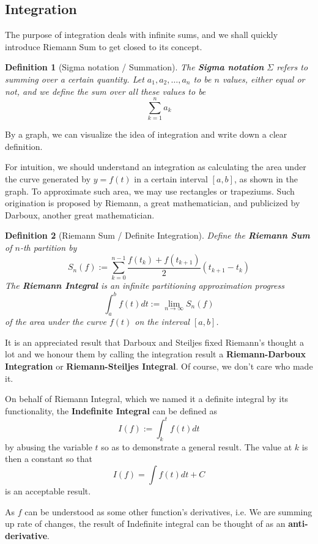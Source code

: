 \documentclass[12pt]{article}
\newtheorem{definition}{Definition}[section]
\begin{document}
    \subsection*{Integration}

    The purpose of integration deals with infinite sums, and we shall quickly introduce Riemann Sum to get closed to its concept.

    \begin{definition}[Sigma notation / Summation]
        The \textbf{Sigma notation} $\Sigma$ refers to summing over a certain quantity. Let $a_1,a_2,\dots,a_n$ to be $n$ values, either equal or not, and we define the sum over all these values to be \[\sum_{k=1}^{n}a_k\]
    \end{definition}

    By a graph, we can visualize the idea of integration and write down a clear definition.



    For intuition, we should understand an integration as calculating the area under the curve generated by $y=f(t)$ in a certain interval $[a,b]$, as shown in the graph. To approximate such area, we may use rectangles or trapeziums. Such origination is proposed by Riemann, a great mathematician, and publicized by Darboux, another great mathematician.

    \begin{definition}[Riemann Sum / Definite Integration]
        Define the \textbf{Riemann Sum} of $n$-th partition by \[S_n(f):=\sum_{k=0}^{n-1} \frac{f(t_k)+f(t_{k+1})}{2}(t_{k+1}-t_k)\] The \textbf{Riemann Integral} is an infinite partitioning approximation progress \[\int_a^b f(t) dt := \lim_{n\to \infty}S_n(f)\] of the area under the curve $f(t)$ on the interval $[a,b]$.
    \end{definition}

    It is an appreciated result that Darboux and Steiljes fixed Riemann's thought a lot and we honour them by calling the integration result a \textbf{Riemann-Darboux Integration} or \textbf{Riemann-Steiljes Integral}. Of course, we don't care who made it.

    On behalf of Riemann Integral, which we named it a definite integral by its functionality, the \textbf{Indefinite Integral} can be defined as \[I(f):= \int_{k}^{t} f(t) dt\] by abusing the variable $t$ so as to demonstrate a general result. The value at $k$ is then a constant so that \[I(f)=\int f(t) dt + C\] is an acceptable result.

    As $f$ can be understood as some other function's derivatives, i.e. We are summing up rate of changes, the result of Indefinite integral can be thought of as an \textbf{anti-derivative}.
\end{document}
